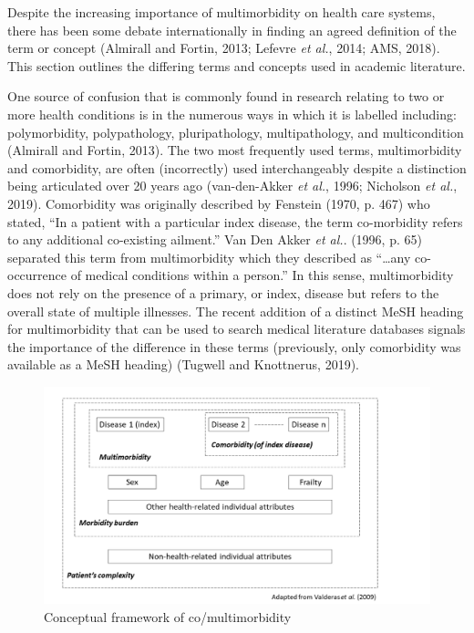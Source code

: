 \documentclass[12pt,a4paper,oneside,table]{report}
\begin{document}
Despite the increasing importance of multimorbidity on health care
systems, there has been some debate internationally in finding an agreed
definition of the term or concept (Almirall and Fortin, 2013; Lefevre
\emph{et al.}, 2014; AMS, 2018). This section outlines the differing
terms and concepts used in academic literature.

One source of confusion that is commonly found in research relating to
two or more health conditions is in the numerous ways in which it is
labelled including: polymorbidity, polypathology, pluripathology,
multipathology, and multicondition (Almirall and Fortin, 2013). The two
most frequently used terms, multimorbidity and comorbidity, are often
(incorrectly) used interchangeably despite a distinction being
articulated over 20 years ago (van-den-Akker \emph{et al.}, 1996;
Nicholson \emph{et al.}, 2019). Comorbidity was originally described by
Fenstein (1970, p. 467) who stated, ``In a patient with a particular
index disease, the term co-morbidity refers to any additional
co-existing ailment.'' Van Den Akker \textit{et al.}. (1996, p. 65)
separated this term from multimorbidity which they described as
``\ldots any co-occurrence of medical conditions within a person.'' In
this sense, multimorbidity does not rely on the presence of a primary,
or index, disease but refers to the overall state of multiple illnesses.
The recent addition of a distinct MeSH heading for multimorbidity that
can be used to search medical literature databases signals the
importance of the difference in these terms (previously, only
comorbidity was available as a MeSH heading) (Tugwell and Knottnerus,
2019).

\begin{figure}[h]
  \centering
    \includegraphics{figures/chapter-lit-review/valderas_2.pdf}
    \caption{Conceptual framework of co/multimorbidity}
    \label{fig:valderas}
\end{figure}
\end{document}
